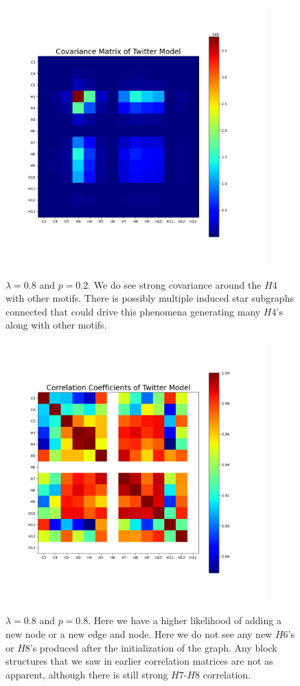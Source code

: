 \begin{figure}
    \includegraphics[width=10cm]{Images/CovMatTwitterModel080209.png}\
    \centering
    \caption{$\lambda=0.8$ and $p=0.2$. We do see strong covariance around the $H4$ with 
    other motifs. There is possibly multiple induced star subgraphs connected that could
    drive this phenomena generating many $H4$'s along with other motifs.}
\end{figure}

\begin{figure}
    \includegraphics[width=10cm]{Images/CorrCoefTwitterModel080809.png}\
    \centering
    \caption{$\lambda=0.8$ and $p=0.8$. Here we have a higher likelihood of adding a new node
     or a new edge and node. Here we do not see any new $H6$'s or $H8$'s produced after the initialization of 
     the graph. Any block structures that we saw in earlier correlation matrices are not as apparent, although
     there is still strong $H7$-$H8$ correlation. }
     \label{fig:corrmat0808}
\end{figure}

